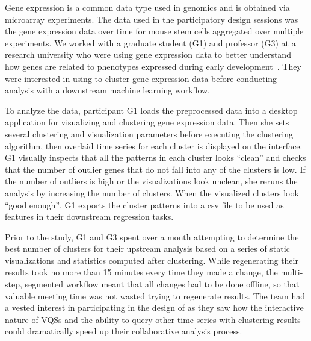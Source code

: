 \par\noindent{} Gene expression is a common data type used in genomics and is obtained via microarray experiments.  The data used in the participatory design sessions was the gene expression data over time for mouse stem cells aggregated over multiple experiments. We worked with a graduate student (G1) and professor (G3) at a research university who were using gene expression data to better understand how genes are related to phenotypes expressed during early development~\cite{Peng2016,Gloss2017}. They were interested in using \zv to cluster gene expression data before conducting analysis with a downstream machine learning workflow.
\par To analyze the data, participant G1 loads the preprocessed data into a desktop application for visualizing and clustering gene expression data. Then she sets several clustering and visualization parameters before executing the clustering algorithm, then overlaid time series for each cluster is displayed on the interface. G1 visually inspects that all the patterns in each cluster looks ``clean'' and checks that the number of outlier genes that do not fall into any of the clusters is low.  If the number of outliers is high or the visualizations look unclean, she reruns the analysis by increasing the number of clusters. When the visualized clusters look ``good enough'', G1 exports the cluster patterns into a csv file to be used as features in their downstream regression tasks.
\par Prior to the study, G1 and G3 spent over a month attempting to determine the best number of clusters for their upstream analysis based on a series of static visualizations and statistics computed after clustering. While regenerating their results took no more than 15 minutes every time they made a change, the multi-step, segmented workflow meant that all changes had to be done offline, so that valuable meeting time was not wasted trying to regenerate results. The team had a vested interest in participating in the design of \zv as they saw how the interactive nature of VQSs and the ability to query other time series with clustering results could dramatically speed up their collaborative analysis process.
